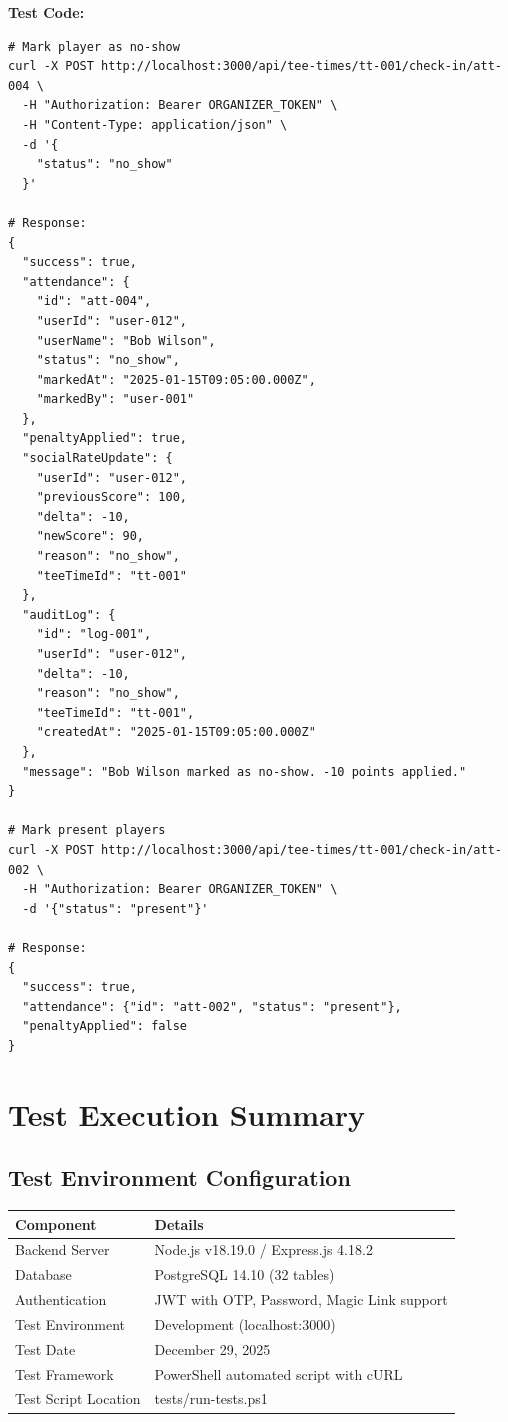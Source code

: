 \documentclass[11pt,a4paper]{article}
\begin{document}
\vspace{0.3cm}
\textbf{Test Code:}
\begin{lstlisting}
# Mark player as no-show
curl -X POST http://localhost:3000/api/tee-times/tt-001/check-in/att-004 \
  -H "Authorization: Bearer ORGANIZER_TOKEN" \
  -H "Content-Type: application/json" \
  -d '{
    "status": "no_show"
  }'

# Response:
{
  "success": true,
  "attendance": {
    "id": "att-004",
    "userId": "user-012",
    "userName": "Bob Wilson",
    "status": "no_show",
    "markedAt": "2025-01-15T09:05:00.000Z",
    "markedBy": "user-001"
  },
  "penaltyApplied": true,
  "socialRateUpdate": {
    "userId": "user-012",
    "previousScore": 100,
    "delta": -10,
    "newScore": 90,
    "reason": "no_show",
    "teeTimeId": "tt-001"
  },
  "auditLog": {
    "id": "log-001",
    "userId": "user-012",
    "delta": -10,
    "reason": "no_show",
    "teeTimeId": "tt-001",
    "createdAt": "2025-01-15T09:05:00.000Z"
  },
  "message": "Bob Wilson marked as no-show. -10 points applied."
}

# Mark present players
curl -X POST http://localhost:3000/api/tee-times/tt-001/check-in/att-002 \
  -H "Authorization: Bearer ORGANIZER_TOKEN" \
  -d '{"status": "present"}'

# Response:
{
  "success": true,
  "attendance": {"id": "att-002", "status": "present"},
  "penaltyApplied": false
}
\end{lstlisting}

\newpage


\section{Test Execution Summary}

\subsection{Test Environment Configuration}

\begin{tabular}{|p{5cm}|p{10cm}|}
\hline
\rowcolor{lightgray}
\textbf{Component} & \textbf{Details} \\
\hline
Backend Server & Node.js v18.19.0 / Express.js 4.18.2 \\
\hline
Database & PostgreSQL 14.10 (32 tables) \\
\hline
Authentication & JWT with OTP, Password, Magic Link support \\
\hline
Test Environment & Development (localhost:3000) \\
\hline
Test Date & December 29, 2025 \\
\hline
Test Framework & PowerShell automated script with cURL \\
\hline
Test Script Location & tests/run-tests.ps1 \\
\hline
\end{tabular}
\end{document}
